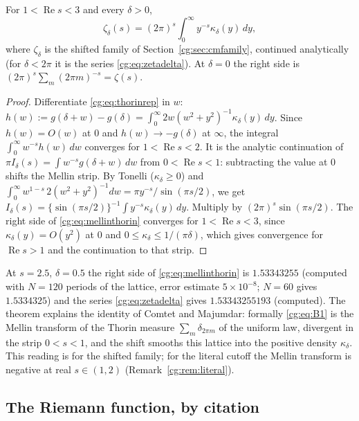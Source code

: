 \begin{theorem}\label{cg:thm:mellinthorin}
For $1<\operatorname{Re}s<3$ and every $\delta>0$,
\begin{equation}\label{cg:eq:mellinthorin}
\zeta_\delta(s)=(2\pi)^s\int_0^\infty y^{-s}\kappa_\delta(y)\,dy,
\end{equation}
where $\zeta_\delta$ is the shifted family of Section~\ref{cg:sec:cmfamily}, continued analytically (for $\delta<2\pi$ it is the series \eqref{cg:eq:zetadelta}). At $\delta=0$ the right side is $(2\pi)^s\sum_m(2\pi m)^{-s}=\zeta(s)$.
\end{theorem}

\begin{proof}
Differentiate \eqref{cg:eq:thorinrep} in $w$: $h(w):=g(\delta+w)-g(\delta)=\int_0^\infty2w(w^2+y^2)^{-1}\kappa_\delta(y)\,dy$. Since $h(w)=O(w)$ at $0$ and $h(w)\to-g(\delta)$ at $\infty$, the integral $\int_0^\infty w^{-s}h(w)\,dw$ converges for $1<\operatorname{Re}s<2$. It is the analytic continuation of $\pi I_\delta(s)=\int w^{-s}g(\delta+w)\,dw$ from $0<\operatorname{Re}s<1$: subtracting the value at $0$ shifts the Mellin strip. By Tonelli ($\kappa_\delta\ge0$) and $\int_0^\infty w^{1-s}\,2(w^2+y^2)^{-1}dw=\pi y^{-s}/\sin(\pi s/2)$, we get $I_\delta(s)=\{\sin(\pi s/2)\}^{-1}\int y^{-s}\kappa_\delta(y)\,dy$. Multiply by $(2\pi)^s\sin(\pi s/2)$. The right side of \eqref{cg:eq:mellinthorin} converges for $1<\operatorname{Re}s<3$, since $\kappa_\delta(y)=O(y^2)$ at $0$ and $0\le\kappa_\delta\le1/(\pi\delta)$, which gives convergence for $\operatorname{Re}s>1$ and the continuation to that strip.
\end{proof}

At $s=2.5$, $\delta=0.5$ the right side of \eqref{cg:eq:mellinthorin} is $1.53343255$ (computed with $N=120$ periods of the lattice, error estimate $5\times10^{-8}$; $N=60$ gives $1.5334325$) and the series \eqref{cg:eq:zetadelta} gives $1.53343255193$ (computed). The theorem explains the identity of Comtet and Majumdar: formally \eqref{cg:eq:B1} is the Mellin transform of the Thorin measure $\sum_m\delta_{2\pi m}$ of the uniform law, divergent in the strip $0<s<1$, and the shift smooths this lattice into the positive density $\kappa_\delta$. This reading is for the shifted family; for the literal cutoff the Mellin transform is negative at real $s\in(1,2)$ (Remark~\ref{cg:rem:literal}).

\subsection{The Riemann function, by citation}\label{cg:sec:xi}

